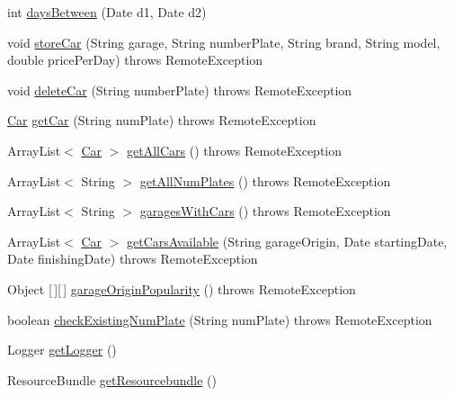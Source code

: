 \begin{DoxyCompactItemize}
\item 
int \mbox{\hyperlink{classcarrenting_1_1client_1_1_controller_adf3e50eccb845807f36a476e870717c8}{days\+Between}} (Date d1, Date d2)
\item 
void \mbox{\hyperlink{classcarrenting_1_1client_1_1_controller_a267c24a1a13732839f548cddfe640f09}{store\+Car}} (String garage, String number\+Plate, String brand, String model, double price\+Per\+Day)  throws Remote\+Exception
\item 
void \mbox{\hyperlink{classcarrenting_1_1client_1_1_controller_acd2c7f2a6a74dd480004505b53d3a42e}{delete\+Car}} (String number\+Plate)  throws Remote\+Exception 
\item 
\mbox{\hyperlink{classcarrenting_1_1server_1_1jdo_1_1_car}{Car}} \mbox{\hyperlink{classcarrenting_1_1client_1_1_controller_ae306f94b15ad4b3869d13ce8f6c46d45}{get\+Car}} (String num\+Plate)  throws Remote\+Exception
\item 
Array\+List$<$ \mbox{\hyperlink{classcarrenting_1_1server_1_1jdo_1_1_car}{Car}} $>$ \mbox{\hyperlink{classcarrenting_1_1client_1_1_controller_a3198f90f6563c389e1f22e52a925ee5d}{get\+All\+Cars}} ()  throws Remote\+Exception
\item 
Array\+List$<$ String $>$ \mbox{\hyperlink{classcarrenting_1_1client_1_1_controller_a2a1f2139f9682b3c1215798216bee256}{get\+All\+Num\+Plates}} ()  throws Remote\+Exception
\item 
Array\+List$<$ String $>$ \mbox{\hyperlink{classcarrenting_1_1client_1_1_controller_a7131927c67ed8afaed347d3090c0e08b}{garages\+With\+Cars}} ()  throws Remote\+Exception
\item 
Array\+List$<$ \mbox{\hyperlink{classcarrenting_1_1server_1_1jdo_1_1_car}{Car}} $>$ \mbox{\hyperlink{classcarrenting_1_1client_1_1_controller_a80d021acb8be8a60823c3da433f5495f}{get\+Cars\+Available}} (String garage\+Origin, Date starting\+Date, Date finishing\+Date)  throws Remote\+Exception
\item 
Object \mbox{[}$\,$\mbox{]}\mbox{[}$\,$\mbox{]} \mbox{\hyperlink{classcarrenting_1_1client_1_1_controller_a26fcc1a9b0108dc2283436a34db76c30}{garage\+Origin\+Popularity}} ()  throws Remote\+Exception
\item 
boolean \mbox{\hyperlink{classcarrenting_1_1client_1_1_controller_a4bd3a1876779b6547d6a56d00de92067}{check\+Existing\+Num\+Plate}} (String num\+Plate)  throws Remote\+Exception 
\item 
Logger \mbox{\hyperlink{classcarrenting_1_1client_1_1_controller_a34a0edf53b5204f26b1a39ff4d8fa316}{get\+Logger}} ()
\item 
Resource\+Bundle \mbox{\hyperlink{classcarrenting_1_1client_1_1_controller_a02bfa40e18727766ed66076119d95cc3}{get\+Resourcebundle}} ()
\end{DoxyCompactItemize}
